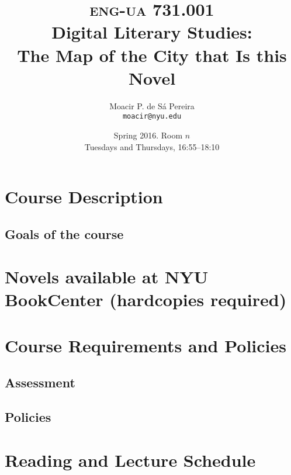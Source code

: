 \documentclass[11pt,article,oneside]{memoir}
\makeatletter
\def\myauthor{Author}
\def\mytitle{Title}
\def\myaddress{}
\def\myemail{}
\def\mycoursecode{}
\def\mycoursename{}
\def\myterm{}
\def\mycoursecode{eng-ua 731.001}
\def\mycoursename{Digital Literary Studies:\\ The Map of the City that Is this Novel}
\def\myterm{Spring 2016}
\def\myaddress{Room $n$}
\def\myemail{moacir@nyu.edu}
\def\myauthor{Moacir P. de Sá Pereira}
\def\mytitle{{\normalsize \textsc{\mycoursecode}\\} \HUGE \mycoursename}
\makeatother
\begin{document}
 \setsansfont[Mapping=tex-text]{Helvetica} 
 \setmonofont[Mapping=tex-text,Scale=0.8]{DejaVu Sans Mono}
 


\def\ind{\hangindent=1 true cm\hangafter=1 \noindent}


\title{\LARGE \mytitle}     
\author{\Large\myauthor\\ \footnotesize\texttt{\noindent\myemail}}
\date{\myterm. \myaddress \\ Tuesdays and Thursdays, 16:55--18:10}

\maketitle

%
%

\section*{Course Description}



\subsection*{Goals of the course}

     
\section*{Novels available at NYU BookCenter \small (hardcopies required)}


	
\section*{Course Requirements and Policies}

  \subsection*{Assessment}
  

	\subsection*{Policies}
	

\newpage

\section*{Reading and Lecture Schedule}


\newpage



\newpage
\printbibliography 
\end{document}

